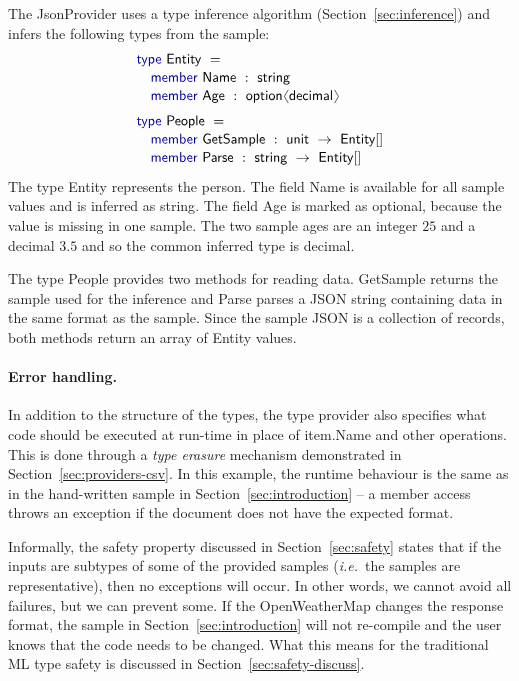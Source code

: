 \documentclass[10pt,preprint,clearpagebib]{sigplanconf}
\newcommand{\langl}{\begin{picture}(4.5,7)
\put(1.1,2.5){\rotatebox{60}{\line(1,0){5.5}}}
\put(1.1,2.5){\rotatebox{300}{\line(1,0){5.5}}}
\end{picture}}
\newcommand{\rangl}{\begin{picture}(4.5,7)
\put(.9,2.5){\rotatebox{120}{\line(1,0){5.5}}}
\put(.9,2.5){\rotatebox{240}{\line(1,0){5.5}}}
\end{picture}}
\newcommand{\kvd}[1]{\textnormal{\textcolor{kvdclr}{\sffamily #1}}}
\newcommand{\ident}[1]{\textnormal{\sffamily #1}}
\begin{document}
The \ident{JsonProvider} uses a type inference algorithm (Section~\ref{sec:inference})  and
infers the following types from the sample:
%
\begin{equation*}
\begin{array}{l}
 \kvd{type}~\ident{Entity}~=  \\[0.1em]
 \quad \kvd{member}~\ident{Name}~:~\ident{string} \\[0.1em]
 \quad \kvd{member}~\ident{Age}~:~\ident{option}\langl \ident{decimal}\rangl \\[0.6em]
 \kvd{type}~\ident{People}~=  \\[0.1em]
 \quad \kvd{member}~\ident{GetSample}~:~\ident{unit}~\rightarrow~\ident{Entity}[] \\[0.1em]
 \quad \kvd{member}~\ident{Parse}~:~\ident{string}~\rightarrow~\ident{Entity}[] \\[0.1em]
\end{array}
\end{equation*}
%
The type \ident{Entity} represents the person. The field \ident{Name} is available for all
sample values and is inferred as \ident{string}. The field \ident{Age} is marked as optional,
because the value is missing in one sample. The two sample ages are an integer $25$ and a 
decimal $3.5$ and so the common inferred type is \ident{decimal}.

The type \ident{People} provides two methods for reading data. \ident{GetSample} returns the
sample used for the inference and \ident{Parse} parses a JSON string containing data in the same 
format as the sample. Since the sample JSON is a collection of records, both methods return an 
array of \ident{Entity} values.

\paragraph{Error handling.}
In addition to the structure of the types, the type provider also specifies what code should be 
executed at run-time in place of \ident{item.Name} and other operations. This is done through a 
\emph{type erasure} mechanism demonstrated in Section~\ref{sec:providers-csv}. In this example,
the runtime behaviour is the same as in the hand-written sample in Section~\ref{sec:introduction} --
a member access throws an exception if the document does not have the expected format.

Informally, the safety property discussed in Section~\ref{sec:safety} states that if the inputs
are subtypes of some of the provided samples (\emph{i.e.}~the samples are representative), then
no exceptions will occur. In other words, we cannot avoid all failures, but we can prevent some.
If the OpenWeatherMap changes the response format, the sample in Section~\ref{sec:introduction}
will not re-compile and the user knows that the code needs to be changed. What this means for
the traditional ML type safety is discussed in Section~\ref{sec:safety-discuss}.
\end{document}
